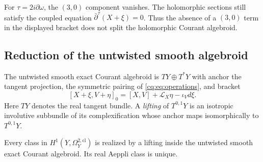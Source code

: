 For $\tau=2i\partial\omega$, the $(3,0)$ component vanishes.
The holomorphic sections still satisfy the coupled equation
$\bar\partial^\tau(X+\xi)=0$.
Thus the absence of a $(3,0)$ term in the displayed bracket
does not split the holomorphic Courant algebroid.

\subsection{Reduction of the untwisted smooth algebroid}

The untwisted smooth exact Courant algebroid is $TY\oplus T^*Y$
with anchor the tangent projection, the symmetric pairing of
\eqref{cq:eq:operations}, and bracket
\[
 [X+\xi,V+\eta]_0=[X,V]+\mathcal L_X\eta-\iota_Vd\xi.
\]
Here $TY$ denotes the real tangent bundle.
A \emph{lifting} of $T^{0,1}Y$ is an isotropic involutive
subbundle of its complexification whose anchor maps
isomorphically to $T^{0,1}Y$.

\begin{proposition}\label{cq:prop:smooth-reduction}
Every class in $H^1(Y,\Omega_Y^{2,\mathrm{cl}})$ is realized by
a lifting inside the untwisted smooth exact Courant algebroid.
Its real Aeppli class is unique.
\end{proposition}

